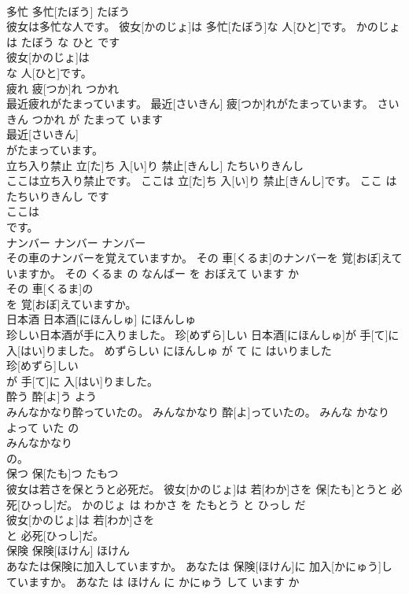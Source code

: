 \documentclass[8pt]{extreport}
\begin{document}
\begin{CJK}{UTF8}{min}
\\	多忙	多忙[たぼう]	たぼう	
\\	彼女は多忙な人です。	彼女[かのじょ]は 多忙[たぼう]な 人[ひと]です。	かのじょ は たぼう な ひと です	
\\	彼女[かのじょ]は
\\	な 人[ひと]です。			
\\	疲れ	疲[つか]れ	つかれ	
\\	最近疲れがたまっています。	最近[さいきん] 疲[つか]れがたまっています。	さいきん つかれ が たまって います	
\\	最近[さいきん]
\\	がたまっています。			
\\	立ち入り禁止	立[た]ち 入[い]り 禁止[きんし]	たちいりきんし	
\\	ここは立ち入り禁止です。	ここは 立[た]ち 入[い]り 禁止[きんし]です。	ここ は たちいりきんし です	
\\	ここは
\\	です。			
\\	ナンバー	ナンバー	ナンバー	
\\	その車のナンバーを覚えていますか。	その 車[くるま]のナンバーを 覚[おぼ]えていますか。	その くるま の なんばー を おぼえて います か	
\\	その 車[くるま]の
\\	を 覚[おぼ]えていますか。			
\\	日本酒	日本酒[にほんしゅ]	にほんしゅ	
\\	珍しい日本酒が手に入りました。	珍[めずら]しい 日本酒[にほんしゅ]が 手[て]に 入[はい]りました。	めずらしい にほんしゅ が て に はいりました	
\\	珍[めずら]しい
\\	が 手[て]に 入[はい]りました。			
\\	酔う	酔[よ]う	よう	
\\	みんなかなり酔っていたの。	みんなかなり 酔[よ]っていたの。	みんな かなり よって いた の	
\\	みんなかなり
\\	の。			
\\	保つ	保[たも]つ	たもつ	
\\	彼女は若さを保とうと必死だ。	彼女[かのじょ]は 若[わか]さを 保[たも]とうと 必死[ひっし]だ。	かのじょ は わかさ を たもとう と ひっし だ	
\\	彼女[かのじょ]は 若[わか]さを
\\	と 必死[ひっし]だ。			
\\	保険	保険[ほけん]	ほけん	
\\	あなたは保険に加入していますか。	あなたは 保険[ほけん]に 加入[かにゅう]していますか。	あなた は ほけん に かにゅう して います か	

\end{CJK}
\end{document}
